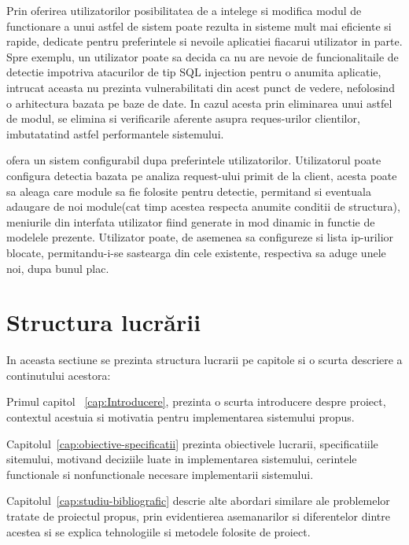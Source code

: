 Prin oferirea utilizatorilor posibilitatea de a intelege si modifica modul de functionare a unui astfel de sistem poate rezulta in sisteme mult mai eficiente si rapide, dedicate pentru preferintele si nevoile aplicatiei fiacarui utilizator in parte. Spre exemplu, un utilizator poate sa decida ca nu are nevoie de funcionalitaile de detectie impotriva atacurilor de tip SQL injection pentru o anumita aplicatie, intrucat aceasta nu prezinta vulnerabilitati din acest punct de vedere, nefolosind o arhitectura bazata pe baze de date. In cazul acesta prin eliminarea unui astfel de modul, se elimina si verificarile aferente asupra reques-urilor clientilor, imbutatatind astfel performantele sistemului.

\textit{\thesistitle} ofera un sistem configurabil dupa preferintele utilizatorilor. Utilizatorul poate configura detectia bazata pe analiza request-ului primit de la client, acesta poate sa aleaga  care module sa fie folosite pentru detectie, permitand si eventuala adaugare de noi module(cat timp acestea respecta anumite conditii de structura), meniurile din interfata utilizator fiind generate in mod dinamic in functie de modelele prezente. Utilizator poate, de asemenea sa configureze si lista ip-urilior blocate, permitandu-i-se sastearga din cele existente, respectiva sa aduge unele noi, dupa bunul plac.



 \section{Structura lucrării}
In aceasta sectiune se prezinta structura lucrarii pe capitole si o scurta descriere a continutului acestora:

Primul capitol ~\ref{cap:Introducere}, prezinta o scurta introducere despre proiect, contextul acestuia si motivatia pentru implementarea sistemului propus.

Capitolul~\ref{cap:obiective-specificatii} prezinta obiectivele lucrarii, specificatiile sitemului, motivand deciziile luate in implementarea sistemului, cerintele functionale si nonfunctionale necesare implementarii sistemului.

 Capitolul~\ref{cap:studiu-bibliografic} descrie alte abordari similare ale problemelor tratate de proiectul propus, prin evidentierea asemanarilor si diferentelor dintre acestea si se explica tehnologiile si metodele folosite de proiect.
 
